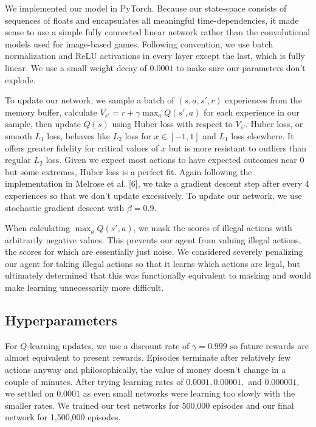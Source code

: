 \documentclass{article}
\begin{document}
We implemented our model in PyTorch. Because our state-space consists of sequences of floats and encapsulates all meaningful time-dependencies, it made sense to use a simple fully connected linear network rather than the convolutional models used for image-based games. Following convention, we use batch normalization and ReLU activations in every layer except the last, which is fully linear. We use a small weight decay of $0.0001$ to make sure our parameters don't explode. 

To update our network, we sample a batch of $(s, a, s', r)$ experiences from the memory buffer, calculate $V_{s'} = r + \gamma \max_{a} Q(s', a)$ for each experience in our sample, then update $Q(s)$ using Huber loss with respect to $V_{s'}$. Huber loss, or smooth $L_1$ loss, behaves like $L_2$ loss for $x \in [-1,1]$ and $L_1$ loss elsewhere. It offers greater fidelity for critical values of $x$ but is more resistant to outliers than regular $L_2$ loss. Given we expect most actions to have expected outcomes near $0$ but some extremes, Huber loss is a perfect fit. Again following the implementation in Melrose et al. [6], we take a gradient descent step after every 4 experiences so that we don't update excessively. To update our network, we use stochastic gradient descent with $\beta = 0.9$. 

When calculating $\max_{a} Q(s', a)$, we mask the scores of illegal actions with arbitrarily negative values. This prevents our agent from valuing illegal actions, the scores for which are essentially just noise. We considered severely penalizing our agent for taking illegal actions so that it learns which actions are legal, but ultimately determined that this was functionally equivalent to masking and would make learning unnecessarily more difficult. 

\subsection{Hyperparameters}

For $Q$-learning updates, we use a discount rate of $\gamma = 0.999$ so future rewards are almost equivalent to present rewards. Episodes terminate after relatively few actions anyway and philosophically, the value of money doesn't change in a couple of minutes. After trying learning rates of $0.0001, 0.00001,$ and $0.000001$, we settled on $0.0001$ as even small networks were learning too slowly with the smaller rates. We trained our test networks for 500,000 episodes and our final network for 1,500,000 episodes. 
\end{document}
